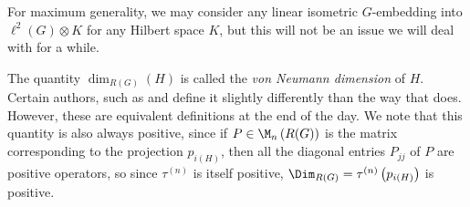 \documentclass[10pt]{mypackage}
\begin{document}
\begin{remark}
  For maximum generality, we may consider any linear isometric $G$-embedding into $\ell^2(G)\otimes K$ for any Hilbert space $K$, but this will not be an issue we will deal with for a while.
\end{remark}
The quantity $\dim_{R(G)}(H)$ is called the \textit{von Neumann dimension} of $H$. Certain authors, such as \cite{luck_l2_homology} and \cite{kammeyer_l2_invariants} define it slightly differently than the way that \cite{loh_l2_homology} does. However, these are equivalent definitions at the end of the day. We note that this quantity is also always positive, since if $P\in \M_n\left( R(G) \right)$ is the matrix corresponding to the projection $p_{i(H)}$, then all the diagonal entries $P_{jj}$ of $P$ are positive operators, so since $\tau^{(n)}$ is itself positive, $\Dim_{R(G)} = \tau^{(n)}\left(p_{i(H)}\right)$ is positive.
\end{document}
